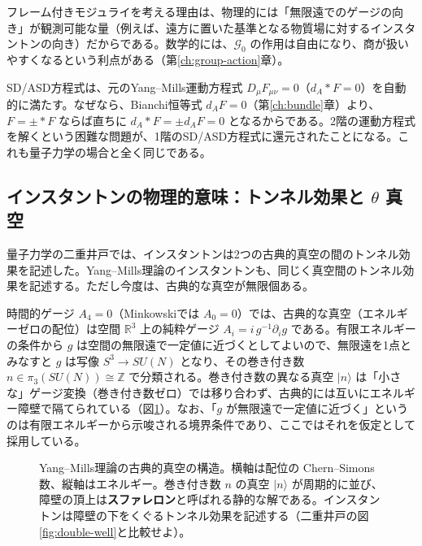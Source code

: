 \documentclass[uplatex, dvipdfmx, book]{jsbook}
\let\origsubsection\subsection
\let\origsubsubsection\subsubsection
\renewcommand{\section}{\origsubsection}
\renewcommand{\subsection}{\origsubsubsection}
\renewcommand{\subsubsection}{\paragraph}
\begin{document}
フレーム付きモジュライを考える理由は、物理的には「無限遠でのゲージの向き」が観測可能な量（例えば、遠方に置いた基準となる物質場に対するインスタントンの向き）だからである。数学的には、$\mathcal{G}_0$ の作用は自由になり、商が扱いやすくなるという利点がある（第\ref{ch:group-action}章）。

SD/ASD方程式は、元のYang--Mills運動方程式 $D_\mu F_{\mu\nu} = 0$（$d_A *F = 0$）を自動的に満たす。なぜなら、Bianchi恒等式 $d_A F = 0$（第\ref{ch:bundle}章）より、$F = \pm *F$ ならば直ちに $d_A *F = \pm d_A F = 0$ となるからである。2階の運動方程式を解くという困難な問題が、1階のSD/ASD方程式に還元されたことになる。これも量子力学の場合と全く同じである。

\section{インスタントンの物理的意味：トンネル効果と $\theta$ 真空}
\label{sec:theta}

量子力学の二重井戸では、インスタントンは2つの古典的真空の間のトンネル効果を記述した。Yang--Mills理論のインスタントンも、同じく真空間のトンネル効果を記述する。ただし今度は、古典的な真空が無限個ある。

時間的ゲージ $A_4 = 0$（Minkowskiでは $A_0 = 0$）では、古典的な真空（エネルギーゼロの配位）は空間 $\mathbb{R}^3$ 上の純粋ゲージ $A_i = i\, g^{-1}\partial_i g$ である。有限エネルギーの条件から $g$ は空間の無限遠で一定値に近づくとしてよいので、無限遠を1点とみなすと $g$ は写像 $S^3 \to SU(N)$ となり、その巻き付き数 $n \in \pi_3(SU(N)) \cong \mathbb{Z}$ で分類される。巻き付き数の異なる真空 $|n\rangle$ は「小さな」ゲージ変換（巻き付き数ゼロ）では移り合わず、古典的には互いにエネルギー障壁で隔てられている（図\ref{fig:periodic-vacua}）。なお、「$g$ が無限遠で一定値に近づく」というのは有限エネルギーから示唆される境界条件であり、ここではそれを仮定として採用している。

\begin{figure}[htbp]
\centering
{}
\caption{Yang--Mills理論の古典的真空の構造。横軸は配位の Chern--Simons 数、縦軸はエネルギー。巻き付き数 $n$ の真空 $|n\rangle$ が周期的に並び、障壁の頂上は\textbf{スファレロン}と呼ばれる静的な解である。インスタントンは障壁の下をくぐるトンネル効果を記述する（二重井戸の図\ref{fig:double-well}と比較せよ）。}
\label{fig:periodic-vacua}
\end{figure}
\end{document}
